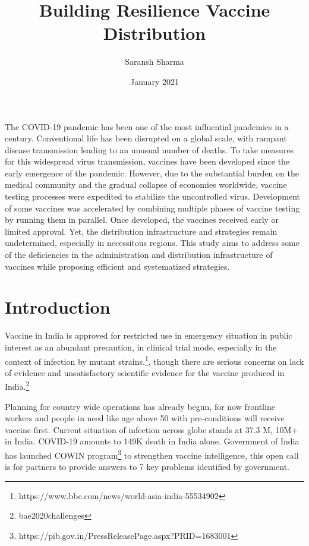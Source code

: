 \documentclass{article}
\begin{document}
\title{Building Resilience Vaccine Distribution}
\author{Saransh Sharma }
\date{January 2021}


\maketitle


\abstract

The COVID-19 pandemic has been one of the most influential pandemics in a century. Conventional life has been disrupted on a global scale, with rampant disease transmission leading to an unusual number of deaths. To take measures for this widespread virus transmission, vaccines have been developed since the early emergence of the pandemic. However, due to the substantial burden on the medical community and the gradual collapse of economies worldwide, vaccine testing processes were expedited to stabilize the uncontrolled virus. Development of some vaccines was accelerated by combining multiple phases of vaccine testing by running them in parallel. Once developed, the vaccines received early or limited approval. Yet, the distribution infrastructure and strategies remain undetermined, especially in necessitous regions. This study aims to address some of the deficiencies in the administration and distribution infrastructure of vaccines while proposing efficient and systematized strategies. 

\section{Introduction}

Vaccine in India is approved for restricted use in emergency situation in public interest as an abundant precaution, in clinical trial mode, especially in the context of infection by mutant strains.\footnote{https://www.bbc.com/news/world-asia-india-55534902}, though there are serious concerns on lack of evidence and unsatisfactory scientific evidence for the vaccine produced in India.\footnote{bae2020challenges}

Planning for country wide operations has already begun, for now frontline workers and people in need like age above 50 with pre-conditions will receive vaccine first. Current situation of infection across globe stands at 37.3 M, 10M+ in India. COVID-19 amounts to 149K death in India alone.
Government of India has launched COWIN program\footnote{https://pib.gov.in/PressReleasePage.aspx?PRID=1683001} to strengthen vaccine intelligence, this open call is for partners to provide answers to 7 key problems identified by government.
\end{document}
